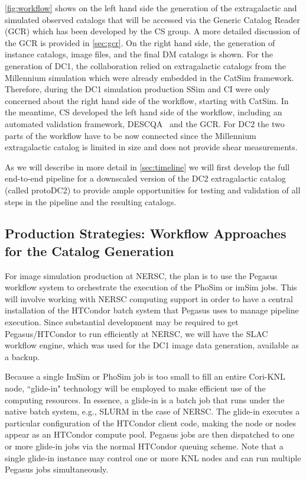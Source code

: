 \documentclass[preprint,times]{aastex61}
\begin{document}
\autoref{fig:workflow} shows on the left hand side the generation of the extragalactic and simulated observed catalogs that will be accessed via the Generic Catalog Reader (GCR) which has been developed by the CS group. A more detailed discussion of the GCR is provided in \autoref{sec:gcr}. On the right hand side, the generation of instance catalogs, image files, and the final DM catalogs is shown. For the generation of DC1, the collaboration relied on extragalactic catalogs from the Millennium simulation which were already embedded in the CatSim framework. Therefore, during the DC1 simulation production SSim and CI were only concerned about the right hand side of the workflow, starting with CatSim. In the meantime, CS developed the left hand side of the workflow, including an automated validation framework, DESCQA~\cite{descqa} and the GCR. For DC2 the two parts of the workflow have to be now connected since the Millennium extragalactic catalog is limited in size and does not provide shear measurements. 

As we will describe in more detail in \autoref{sec:timeline} we will first develop the full end-to-end pipeline for a downscaled version of the DC2 extragalactic catalog (called protoDC2) to provide ample opportunities for testing and validation of all steps in the pipeline and the resulting catalogs.

\subsection{Production Strategies: Workflow Approaches for the Catalog Generation}
\label{sec:worklfow}
For image simulation production at NERSC, the plan is to use the Pegasus workflow system to orchestrate the execution of the PhoSim or imSim jobs.  This will involve working with NERSC computing support in order to have a central installation of the HTCondor batch system that Pegasus uses to manage pipeline execution.  Since substantial development may be required to get Pegasus/HTCondor to run efficiently at NERSC, we will have the SLAC workflow engine, which was used for the DC1 image data generation, available as a backup. 

Because a single ImSim or PhoSim job is too small to fill an entire Cori-KNL node, ``glide-in" technology will be employed to make efficient use of the computing resources.  In essence, a glide-in is a batch job that runs under the native batch system, e.g., SLURM in the case of NERSC.  The glide-in executes a particular configuration of the HTCondor client code, making the node or nodes appear as an HTCondor compute pool.  Pegasus jobs are then dispatched to one or more glide-in jobs via the normal HTCondor queuing scheme.  Note that a single glide-in instance may control one or more KNL nodes and can run multiple Pegasus jobs simultaneously.
\end{document}

